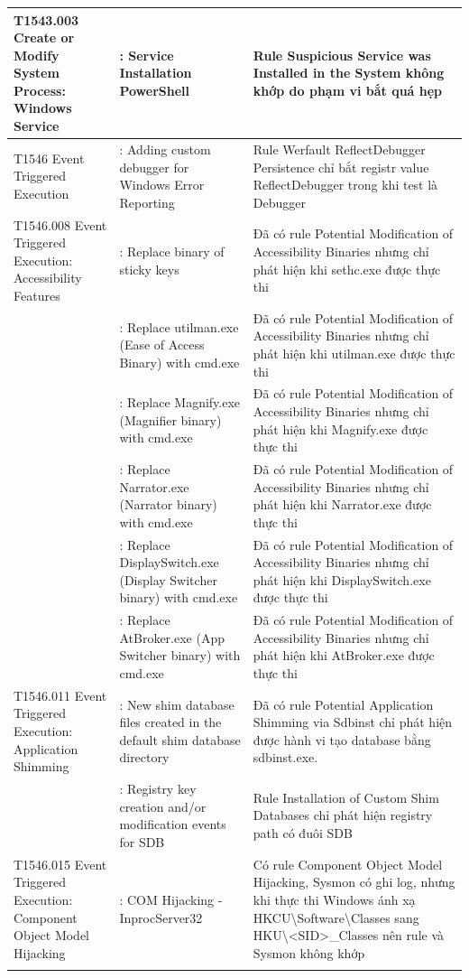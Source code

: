 \begin{longtable}{|>{\raggedright\arraybackslash}p{3.2cm}|>{\raggedright\arraybackslash}p{5.5cm}|>{\raggedright\arraybackslash}p{5.8cm}|}
\hline
T1543.003 Create or Modify System Process: Windows Service & 3: Service Installation PowerShell & Rule Suspicious Service was Installed in the System không khớp do phạm vi bắt quá hẹp \\
\hline
T1546 Event Triggered Execution & 5: Adding custom debugger for Windows Error Reporting & Rule Werfault ReflectDebugger Persistence chỉ bắt registr value ReflectDebugger trong khi test là Debugger \\
\hline
T1546.008 Event Triggered Execution: Accessibility Features & 2: Replace binary of sticky keys & Đã có rule Potential Modification of Accessibility Binaries nhưng chỉ phát hiện khi sethc.exe được thực thi \\*
\cline{2-3}
 & 6: Replace utilman.exe (Ease of Access Binary) with cmd.exe & Đã có rule Potential Modification of Accessibility Binaries nhưng chỉ phát hiện khi utilman.exe được thực thi \\*
\cline{2-3}
 & 7: Replace Magnify.exe (Magnifier binary) with cmd.exe & Đã có rule Potential Modification of Accessibility Binaries nhưng chỉ phát hiện khi Magnify.exe được thực thi \\*
\cline{2-3}
 & 8: Replace Narrator.exe (Narrator binary) with cmd.exe & Đã có rule Potential Modification of Accessibility Binaries nhưng chỉ phát hiện khi Narrator.exe được thực thi \\*
\cline{2-3}
 & 9: Replace DisplaySwitch.exe (Display Switcher binary) with cmd.exe & Đã có rule Potential Modification of Accessibility Binaries nhưng chỉ phát hiện khi DisplaySwitch.exe được thực thi \\*
\cline{2-3}
 & 10: Replace AtBroker.exe (App Switcher binary) with cmd.exe & Đã có rule Potential Modification of Accessibility Binaries nhưng chỉ phát hiện khi AtBroker.exe được thực thi \\
\hline
T1546.011 Event Triggered Execution: Application Shimming & 2: New shim database files created in the default shim database directory & Đã có rule Potential Application Shimming via Sdbinst chỉ phát hiện được hành vi tạo database bằng sdbinst.exe. \\*
\cline{2-3}
 & 3: Registry key creation and/or modification events for SDB & Rule Installation of Custom Shim Databases chỉ phát hiện registry path có đuôi SDB \\
\hline
T1546.015 Event Triggered Execution: Component Object Model Hijacking & 1: COM Hijacking - InprocServer32 & Có rule Component Object Model Hijacking, Sysmon có ghi log, nhưng khi thực thi Windows ánh xạ HKCU\textbackslash{}Software\textbackslash{}Classes sang HKU\textbackslash{}<SID>\_Classes nên rule và Sysmon không khớp \\*

\end{longtable}
